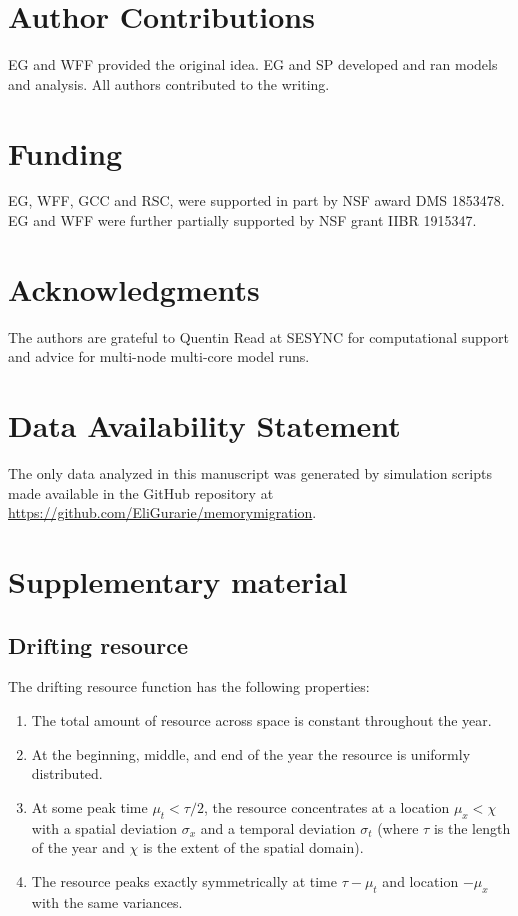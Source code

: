 \documentclass[utf8]{frontiersSCNS} %
\begin{document}
	\section*{Author Contributions}
	
	EG and WFF provided the original idea. EG and SP developed and ran models and analysis. All authors contributed to the writing. 
	
	\section*{Funding}
	
	EG, WFF, GCC and RSC, were supported in part by NSF award DMS 1853478. EG and WFF were further partially supported by NSF grant IIBR 1915347. 
	
	\section*{Acknowledgments}
	The authors are grateful to Quentin Read at SESYNC for computational support and advice for multi-node multi-core model runs. 
	
	
	\section*{Data Availability Statement}
	
	The only data analyzed in this manuscript was generated by simulation scripts made available in the GitHub repository at \url{https://github.com/EliGurarie/memorymigration}. 
	
	 
	
	
	\clearpage
	\appendix
	
	\section{Supplementary material}
	\normalsize
	
	\subsection{Drifting resource}
	The drifting resource function has the following properties:
	
	\begin{enumerate}
		\item The total amount of resource across space is constant throughout the year.
		\item At the beginning, middle, and end of the year the resource is uniformly distributed. 
		\item At some peak time $\mu_t < \tau/2$, the resource concentrates at a location $\mu_x < \chi$ with a spatial deviation $\sigma_x$ and a temporal deviation $\sigma_t$ (where $\tau$ is the length of the year and $\chi$ is the extent of the spatial domain).
		\item The resource peaks exactly symmetrically at time $\tau - \mu_t$ and location $-\mu_x$ with the same variances.
	\end{enumerate}
	
\end{document}
